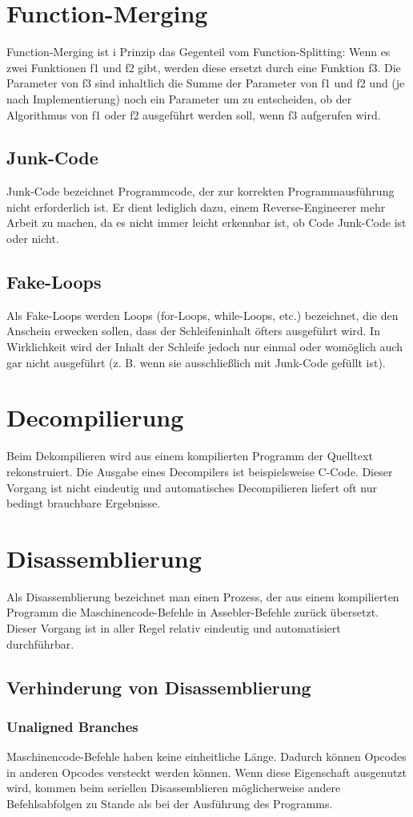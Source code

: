 \begin{multicols}{3}
\section{Function-Merging}
Function-Merging ist i Prinzip das Gegenteil vom Function-Splitting: Wenn es zwei Funktionen f1 und f2 gibt, werden diese ersetzt durch eine Funktion f3. Die Parameter von f3 sind inhaltlich die Summe der Parameter von f1 und f2 und (je nach Implementierung) noch ein Parameter um zu entscheiden, ob der Algorithmus von f1 oder f2 ausgeführt werden soll, wenn f3 aufgerufen wird.
\subsection{Junk-Code}
Junk-Code bezeichnet Programmcode, der zur korrekten Programmausführung nicht erforderlich ist. Er dient lediglich dazu, einem Reverse-Engineerer mehr Arbeit zu machen, da es nicht immer leicht erkennbar ist, ob Code Junk-Code ist oder nicht.
\subsection{Fake-Loops}
Als Fake-Loops werden Loops (for-Loops, while-Loops, etc.) bezeichnet, die den Anschein erwecken sollen, dass der Schleifeninhalt öfters ausgeführt wird. In Wirklichkeit wird der Inhalt der Schleife jedoch nur einmal oder womöglich auch gar nicht ausgeführt (z. B. wenn sie ausschließlich mit Junk-Code gefüllt ist).
\section{Decompilierung}
Beim Dekompilieren wird aus einem kompilierten Programm der Quelltext rekonstruiert. Die Ausgabe eines Decompilers ist beispielsweise C-Code. Dieser Vorgang ist nicht eindeutig und automatisches Decompilieren liefert oft nur bedingt brauchbare Ergebnisse.
\section{Disassemblierung}
Als Disassemblierung bezeichnet man einen Prozess, der aus einem kompilierten Programm die Maschinencode-Befehle in Assebler-Befehle zurück übersetzt. Dieser Vorgang ist in aller Regel relativ eindeutig und automatisiert durchführbar.
\subsection{Verhinderung von Disassemblierung}
\subsubsection{Unaligned Branches}
Maschinencode-Befehle haben keine einheitliche Länge. Dadurch können Opcodes in anderen Opcodes versteckt werden können. Wenn diese Eigenschaft ausgenutzt wird, kommen beim seriellen Disassemblieren möglicherweise andere Befehlsabfolgen zu Stande als bei der Ausführung des Programms. 

\end{multicols}
